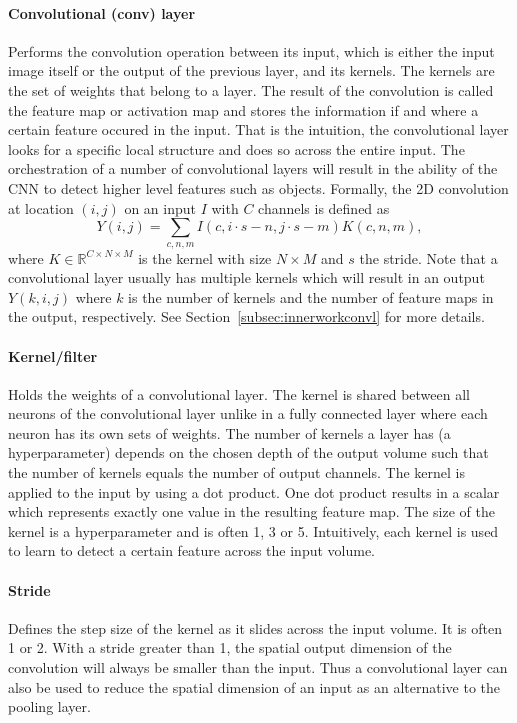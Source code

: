 \documentclass[a4paper,12pt]{report}
\begin{document}
\paragraph{Convolutional (conv) layer} Performs the convolution operation between its input, which is either the input image itself or the output of the previous layer, and its kernels. The kernels are the set of weights that belong to a layer. The result of the convolution is called the feature map or activation map and stores the information if and where a certain feature occured in the input. That is the intuition, the convolutional layer looks for a specific local structure and does so across the entire input. The orchestration of a number of convolutional layers will result in the ability of the CNN to detect higher level features such as objects. Formally, the 2D convolution at location $(i,j)$ on an input $I$ with $C$ channels is defined as
\begin{equation} \label{eq:0}
Y(i,j) = \sum_{c,n,m} I(c,i \cdot s - n, j \cdot s - m)K(c,n,m),
\end{equation}
where $K \in \mathbb{R}^{C \times N \times M}$ is the kernel with size $N \times M$ and $s$ the stride. Note that a convolutional layer usually has multiple kernels which will result in an output $Y(k,i,j)$ where $k$ is the number of kernels and the number of feature maps in the output, respectively. See Section~\ref{subsec:innerworkconvl} for more details. 
\paragraph{Kernel/filter            } Holds the weights of a convolutional layer. The kernel is shared between all neurons of the convolutional layer unlike in a fully connected layer where each neuron has its own sets of weights. The number of kernels a layer has (a hyperparameter) depends on the chosen depth of the output volume such that the number of kernels equals the number of output channels. The kernel is applied to the input by using a dot product. One dot product results in a scalar which represents exactly one value in the resulting feature map. The size of the kernel is a hyperparameter and is often 1, 3 or 5. Intuitively, each kernel is used to learn to detect a certain feature across the input volume.

\paragraph{Stride                   } Defines the step size of the kernel as it slides across the input volume. It is often 1 or 2. With a stride greater than 1, the spatial output dimension of the convolution will always be smaller than the input. Thus a convolutional layer can also be used to reduce the spatial dimension of an input as an alternative to the pooling layer.
\end{document}
